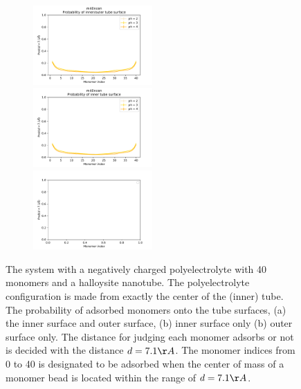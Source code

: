     \begin{figure}[h!]
      \centering
        \begin{subfigure}{\linewidth}
          \centering
            \includegraphics[width=0.5\textwidth]{fig/m40ncen-prob-io.pdf}  
            \includegraphics[width=0.5\textwidth]{fig/m40ncen-prob-i.pdf}
            \includegraphics[width=0.5\textwidth]{fig/m40ncen-prob-o.pdf}
            \end{subfigure}\par\medskip
     \caption{The system with a negatively charged polyelectrolyte with 40 monomers and a halloysite nanotube. The polyelectrolyte configuration is made from exactly the center of the (inner) tube. The probability of adsorbed monomers onto the tube surfaces, (a) the inner surface and outer surface, (b) inner surface only (b) outer surface only. The distance for judging each monomer adsorbs or not is decided with the distance $d = 7.1\AA$. The monomer indices from 0 to 40 is designated to be adsorbed when the center of mass of a monomer bead is located within the range of $d = 7.1\AA$.  }
    \label{fig:m40ncen-prob} %
    \end{figure}

